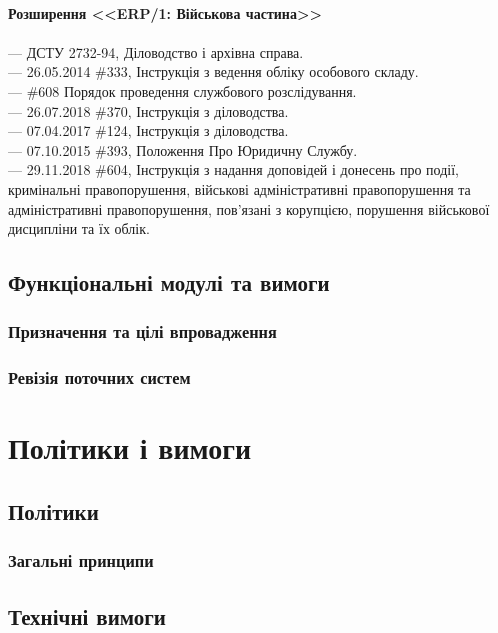 \\
\newpage
{\bf Розширення <<ERP/1: Військова частина>>}
\\
\\
--- {ДСТУ 2732-94}, Діловодство і архівна справа. \\
--- {26.05.2014 \#333}, Інструкція з ведення обліку особового складу. \\
--- {\#608} Порядок проведення службового розслідування. \\
--- {26.07.2018 \#370}, Інструкція з діловодства. \\
--- {07.04.2017 \#124}, Інструкція з діловодства. \\
--- {07.10.2015 \#393}, Положення Про Юридичну Службу. \\
--- {29.11.2018 \#604}, Інструкція з надання доповідей і донесень про події,
                кримінальні правопорушення, військові адміністративні
                правопорушення та адміністративні правопорушення,
                пов'язані з корупцією, порушення військової дисципліни та їх облік. \\

\section{Функціональні модулі та вимоги}

\subsection{Призначення та цілі впровадження}

\subsection{Ревізія поточних систем}

\newpage
\chapter{Політики і вимоги}

\section{Політики}

\subsection{Загальні принципи}

\section{Технічні вимоги}

